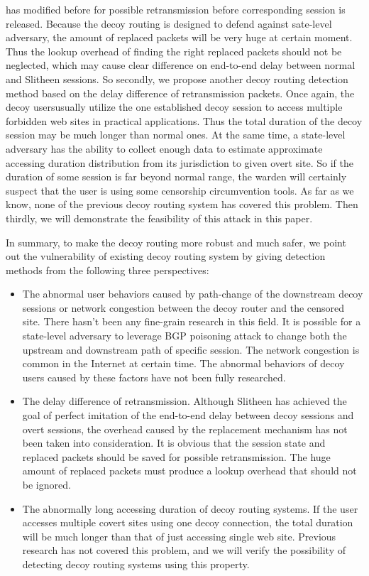 \documentclass[conference]{IEEEtran}
\begin{document}
has modified before for possible retransmission before corresponding session is released. Because the decoy routing is designed to defend against sate-level adversary, the amount of replaced packets will be very huge at certain moment. Thus the lookup overhead of finding the right replaced packets should not be neglected, which may cause clear difference on end-to-end delay between normal and Slitheen sessions. So secondly, we propose another decoy routing detection method based on the delay difference of retransmission packets. Once again, the decoy usersusually utilize the one established decoy session to access multiple forbidden web sites in practical applications. Thus the total duration of the decoy session may be much longer than normal ones. At the same time, a state-level adversary has the ability to collect enough data to estimate approximate accessing duration distribution from its jurisdiction to given overt site. So if the duration of some session is far beyond normal range, the warden will certainly suspect that the user is using some censorship circumvention tools. As far as we know, none of the previous decoy routing system has covered this problem. Then thirdly, we will demonstrate the feasibility of this attack in this paper. 

In summary, to make the decoy routing more robust and much safer, we point out the vulnerability of existing decoy routing system by giving detection methods from the following three perspectives:
\begin{itemize}
\item The abnormal user behaviors caused by path-change of the downstream decoy sessions or network congestion between the decoy router and the censored site. There hasn’t been any fine-grain research in this field. It is possible for a state-level adversary to leverage BGP poisoning attack to change both the upstream and downstream path of specific session. The network congestion is common in the Internet at certain time. The abnormal behaviors of decoy users caused by these factors have not been fully researched.
\item The delay difference of retransmission. Although Slitheen has achieved the goal of perfect imitation of the end-to-end delay between decoy sessions and overt sessions, the overhead caused by the replacement mechanism has not been taken into consideration. It is obvious that the session state and replaced packets should be saved for possible retransmission. The huge amount of replaced packets must produce a lookup overhead that should not be ignored.
\item The abnormally long accessing duration of decoy routing systems. If the user accesses multiple covert sites using one decoy connection, the total duration will be much longer than that of just accessing single web site. Previous research has not covered this problem, and we will verify the possibility of detecting decoy routing systems using this property.
\end{itemize}
\end{document}
